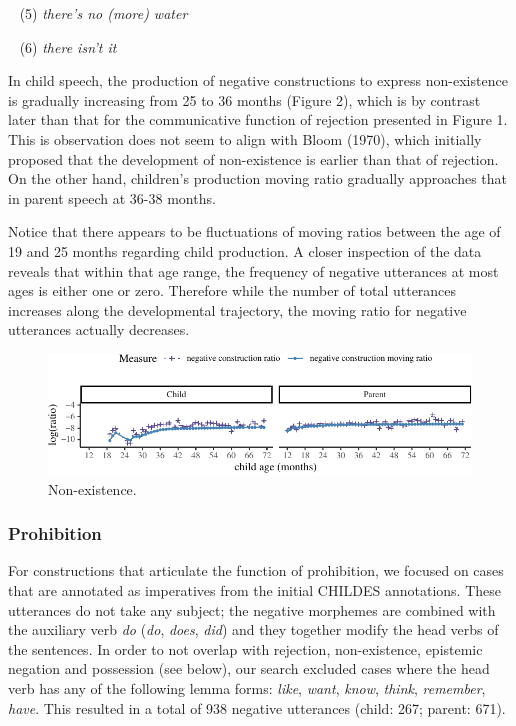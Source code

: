\documentclass[10pt, letterpaper]{article}
\newenvironment{CodeChunk}{}{}
\begin{document}
~ (5) \emph{there's no (more) water}

~ (6) \emph{there isn't it}

In child speech, the production of negative constructions to express
non-existence is gradually increasing from 25 to 36 months (Figure 2),
which is by contrast later than that for the communicative function of
rejection presented in Figure 1. This is observation does not seem to
align with Bloom (1970), which initially proposed that the development
of non-existence is earlier than that of rejection. On the other hand,
children's production moving ratio gradually approaches that in parent
speech at 36-38 months.

Notice that there appears to be fluctuations of moving ratios between
the age of 19 and 25 months regarding child production. A closer
inspection of the data reveals that within that age range, the frequency
of negative utterances at most ages is either one or zero. Therefore
while the number of total utterances increases along the developmental
trajectory, the moving ratio for negative utterances actually decreases.

\begin{figure}[h]

\begin{CodeChunk}


\begin{center}\includegraphics{figs/existence-1} \end{center}

\end{CodeChunk}
\caption[This image spans both columns]{Non-existence.}\label{fig:non-existence}
\end{figure}

\hypertarget{prohibition}{%
\subsubsection{Prohibition}\label{prohibition}}

For constructions that articulate the function of prohibition, we
focused on cases that are annotated as imperatives from the initial
CHILDES annotations. These utterances do not take any subject; the
negative morphemes are combined with the auxiliary verb \emph{do}
(\emph{do}, \emph{does}, \emph{did}) and they together modify the head
verbs of the sentences. In order to not overlap with rejection,
non-existence, epistemic negation and possession (see below), our search
excluded cases where the head verb has any of the following lemma forms:
\emph{like}, \emph{want}, \emph{know}, \emph{think}, \emph{remember},
\emph{have}. This resulted in a total of 938 negative utterances (child:
267; parent: 671).
\end{document}
